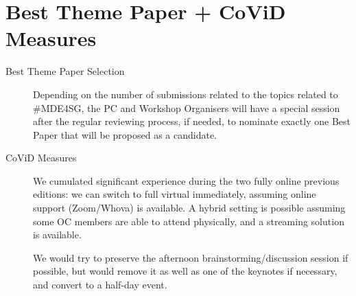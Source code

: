 \section{Best Theme Paper + CoViD Measures}
\label{sec:Best}

\begin{description}
   \item[Best Theme Paper Selection] Depending on the number of submissions 
   related to the topics related to \#MDE4SG, the PC and Workshop Organisers 
   will have a special session after the regular reviewing process, if needed, 
   to nominate exactly one Best Paper that will be proposed as a candidate. 

   \item[CoViD Measures] We cumulated significant experience during the two 
   fully online previous editions: we can switch to full virtual immediately,
   assuming online support (Zoom/Whova) is available. A hybrid setting is 
   possible assuming some OC members are able to attend physically, and a streaming
   solution is available.
   
   We would try to preserve the afternoon brainstorming/discussion session if possible,
   but would remove it as well as one of the keynotes if necessary, and convert
   to a half-day event. 
\end{description}
